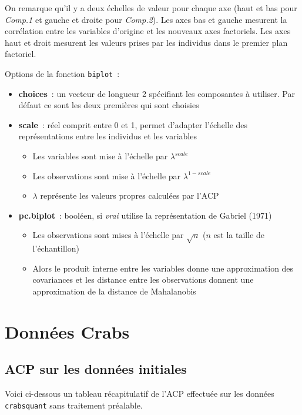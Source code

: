 \documentclass[a4paper,10pt]{report}
\begin{document}
On remarque qu'il y a deux échelles de valeur pour chaque axe (haut et bas pour \textit{Comp.1} et gauche et droite pour \textit{Comp.2}). Les axes bas et gauche mesurent la corrélation entre les variables d'origine et les nouveaux axes factoriels. Les axes haut et droit mesurent les valeurs prises par les individus dans le premier plan factoriel.

Options de la fonction \texttt{biplot}~:
\begin{itemize}
	\item \textbf{choices}~: un vecteur de longueur 2 spécifiant les composantes à utiliser. Par défaut ce sont les deux premières qui sont choisies
	
	\item \textbf{scale}~: réel comprit entre 0 et 1, permet d'adapter l'échelle des représentations entre les individus et les variables
	\begin{itemize}
		\item Les variables sont mise à l'échelle par $\lambda^{scale}$
		\item Les observations sont mise à l'échelle par $\lambda^{1-scale}$
		\item $\lambda$ représente les valeurs propres calculées par l'ACP
	\end{itemize}

	\item \textbf{pc.biplot}~: booléen, si \textit{vrai} utilise la représentation de Gabriel (1971)
	\begin{itemize}
		\item Les observations sont mises à l'échelle par $\sqrt{n}$ ($n$ est la taille de l'échantillon)
		\item Alors le produit interne entre les variables donne une approximation des covariances et les distance entre les observations donnent une approximation de la distance de Mahalanobis
	\end{itemize}
\end{itemize}

\section{Données Crabs}
\label{sec:2_3_ACP_Crabs}

\subsection{ACP sur les données initiales}

Voici ci-dessous un tableau récapitulatif de l'ACP effectuée sur les données \texttt{crabsquant} sans traitement préalable.
\end{document}
